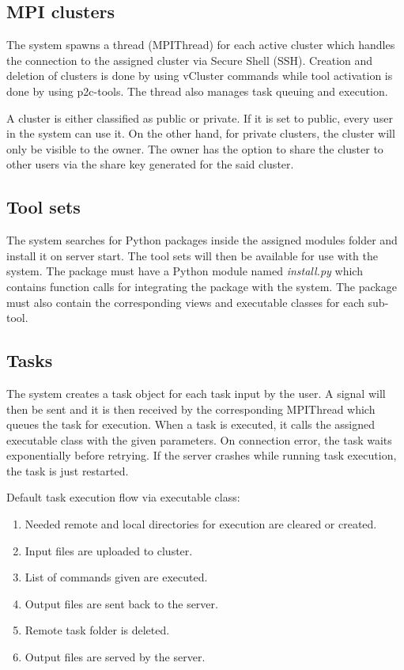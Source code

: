 \subsection{MPI clusters} 

The system spawns a thread (MPIThread) for each active cluster which handles the connection to the assigned cluster via Secure Shell (SSH). Creation and deletion of clusters is done by using vCluster commands while tool activation is done by using p2c-tools. The thread also manages task queuing and execution.
		
A cluster is either classified as public or private. If it is set to public, every user in the system can use it. On the other hand, for private clusters, the cluster will only be visible to the owner. The owner has the option to share the cluster to other users via the share key generated for the said cluster. 		

\subsection{Tool sets} 
The system searches for Python packages inside the assigned modules folder and install it on server start. The tool sets will then be available for use with the system. The package must have a Python module named \emph{install.py} which contains function calls for integrating the package with the system. The package must also contain the corresponding views and executable classes for each sub-tool.  

\subsection{Tasks} 
The system creates a task object for each task input by the user. A signal will then be sent and it is then received by the corresponding MPIThread which queues the task for execution. When a task is executed, it calls the assigned executable class with the given parameters. On connection error, the task waits exponentially before retrying. If the server crashes while running task execution, the task is just restarted.				
		
Default task execution flow via executable class:			
	\begin{enumerate}
		\item  Needed remote and local directories for execution are cleared or created.
		\item  Input files are uploaded to cluster.
		\item  List of commands given are executed.
		\item  Output files are sent back to the server.
		\item  Remote task folder is deleted.
		\item  Output files are served by the server.
	\end{enumerate}	

